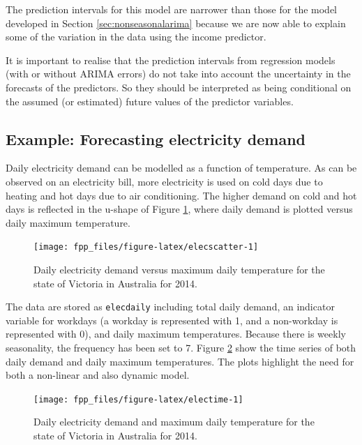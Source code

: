 \documentclass[]{book}
\begin{document}
The prediction intervals for this model are narrower than those for the model developed in Section \ref{sec:nonseasonalarima} because we are now able to explain some of the variation in the data using the income predictor.

It is important to realise that the prediction intervals from regression models (with or without ARIMA errors) do not take into account the uncertainty in the forecasts of the predictors. So they should be interpreted as being conditional on the assumed (or estimated) future values of the predictor variables.

\hypertarget{example-forecasting-electricity-demand}{%
\subsection*{Example: Forecasting electricity demand}\label{example-forecasting-electricity-demand}}

Daily electricity demand can be modelled as a function of temperature. As can be observed on an electricity bill, more electricity is used on cold days due to heating and hot days due to air conditioning. The higher demand on cold and hot days is reflected in the u-shape of Figure \ref{fig:elecscatter}, where daily demand is plotted versus daily maximum temperature.

\begin{figure}

{\centering \texttt{[image: fpp\_files/figure-latex/elecscatter-1]} 

}

\caption{Daily electricity demand versus maximum daily temperature for the state of Victoria in Australia for 2014.}\label{fig:elecscatter}
\end{figure}

The data are stored as \texttt{elecdaily} including total daily demand, an indicator variable for workdays (a workday is represented with 1, and a non-workday is represented with 0), and daily maximum temperatures. Because there is weekly seasonality, the frequency has been set to 7. Figure \ref{fig:electime} show the time series of both daily demand and daily maximum temperatures. The plots highlight the need for both a non-linear and also dynamic model.

\begin{figure}

{\centering \texttt{[image: fpp\_files/figure-latex/electime-1]} 

}

\caption{Daily electricity demand and maximum daily temperature for the state of Victoria in Australia for 2014.}\label{fig:electime}
\end{figure}
\end{document}
